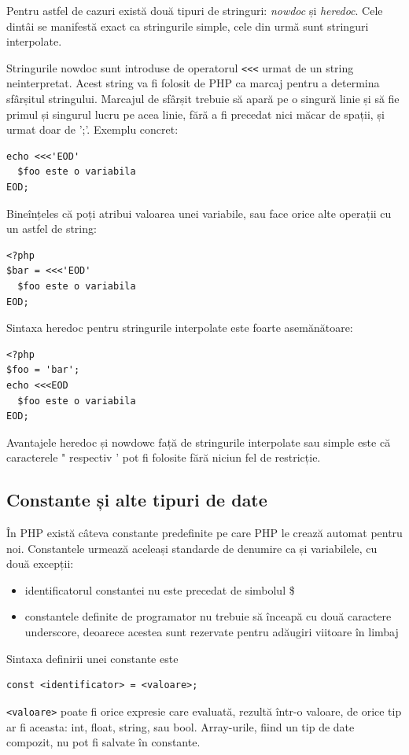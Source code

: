 Pentru astfel de cazuri există două tipuri de stringuri: \textsl{nowdoc} și \textsl{heredoc}.
Cele dintâi se manifestă exact ca stringurile simple, cele din urmă
sunt stringuri interpolate.

Stringurile nowdoc sunt introduse de operatorul  \verb '<<<' urmat de un string neinterpretat.
Acest string va fi folosit de PHP ca marcaj pentru a determina sfârșitul stringului. Marcajul de sfârșit trebuie
să apară pe o singură linie și să fie primul și singurul lucru pe acea linie, fără a fi precedat nici măcar
de spații, și urmat doar de ';'. Exemplu concret:

\begin{lstlisting}
echo <<<'EOD'
  $foo este o variabila 
EOD;
\end{lstlisting}

Bineînțeles că poți atribui valoarea unei variabile, sau face orice
alte operații cu un astfel de string:
\begin{lstlisting}
<?php
$bar = <<<'EOD'
  $foo este o variabila
EOD;
\end{lstlisting}

Sintaxa heredoc pentru stringurile interpolate este foarte asemănătoare:
\begin{lstlisting}
<?php
$foo = 'bar';
echo <<<EOD
  $foo este o variabila 
EOD;
\end{lstlisting}

Avantajele heredoc și nowdowc față de stringurile interpolate sau simple este că
caracterele " respectiv ' pot fi folosite fără niciun fel de restricție.

\subsection{Constante și alte tipuri de date}
În PHP există câteva constante predefinite pe care PHP le
crează automat pentru noi. Constantele urmează aceleași
standarde de denumire ca și variabilele, cu două excepții:
\begin{itemize}
	\item identificatorul constantei nu este precedat de simbolul \$
	\item constantele definite de programator nu trebuie să înceapă cu două caractere
underscore, deoarece acestea sunt rezervate pentru adăugiri viitoare în limbaj
\end{itemize}
Sintaxa definirii unei constante este
\begin{verbatim}
const <identificator> = <valoare>;
\end{verbatim}
\texttt{<valoare>} poate fi orice expresie care evaluată, rezultă într-o valoare,
de orice tip ar fi aceasta: int, float, string, sau bool. Array-urile, fiind un tip
de date compozit, nu pot fi salvate în constante.

